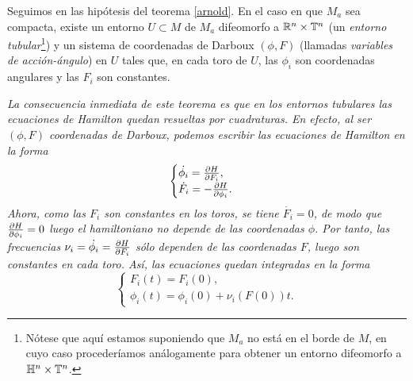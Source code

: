  \begin{thm}
   Seguimos en las hipótesis del teorema \ref{arnold}. En el caso en que $M_a$ sea compacta, existe un entorno $U\subset M$ de $M_a$ difeomorfo a $\mathbb{R}^n \times \mathbb{T}^n$ (un \emph{entorno tubular}\footnote{Nótese que aquí estamos suponiendo que $M_a$ no está en el borde de $M$, en cuyo caso procederíamos análogamente para obtener un entorno difeomorfo a $\mathbb{H}^n \times \mathbb{T}^n$.})
 y un sistema de coordenadas de Darboux $(\phi,F)$ (llamadas \emph{variables de acción-ángulo}) en $U$ tales que, en cada toro de $U$, las $\phi_i$ son coordenadas angulares y las $F_i$ son constantes. 
  \end{thm}

  \begin{obs}
    \em
    La consecuencia inmediata de este teorema es que en los entornos tubulares las ecuaciones de Hamilton quedan resueltas por cuadraturas. En efecto, al ser $(\phi,F)$ coordenadas de Darboux, podemos escribir las ecuaciones de Hamilton en la forma
    \begin{equation*}
      \begin{cases}
	\dot{\phi_i}=\frac{\partial H}{\partial F_i}, \\ 
	\dot{F_i}=-\frac{\partial H}{\partial \phi_i}.
      \end{cases}
    \end{equation*}
    Ahora, como las $F_i$ son constantes en los toros, se tiene $\dot{F_i}=0$, de modo que $\frac{\partial H}{\partial \phi_i}=0$ luego el hamiltoniano no depende de las coordenadas $\phi$. Por tanto, las frecuencias $\nu_i=\dot{\phi_i}=\frac{\partial H}{\partial F_i}$ sólo dependen de las coordenadas $F$, luego son constantes en cada toro. Así, las ecuaciones quedan integradas en la forma
    \begin{equation*}
      \begin{cases}
	F_i(t)=F_i(0), \\
	\phi_i(t)=\phi_i(0)+\nu_i(F(0)) t. 
      \end{cases}
    \end{equation*}
  \end{obs}

